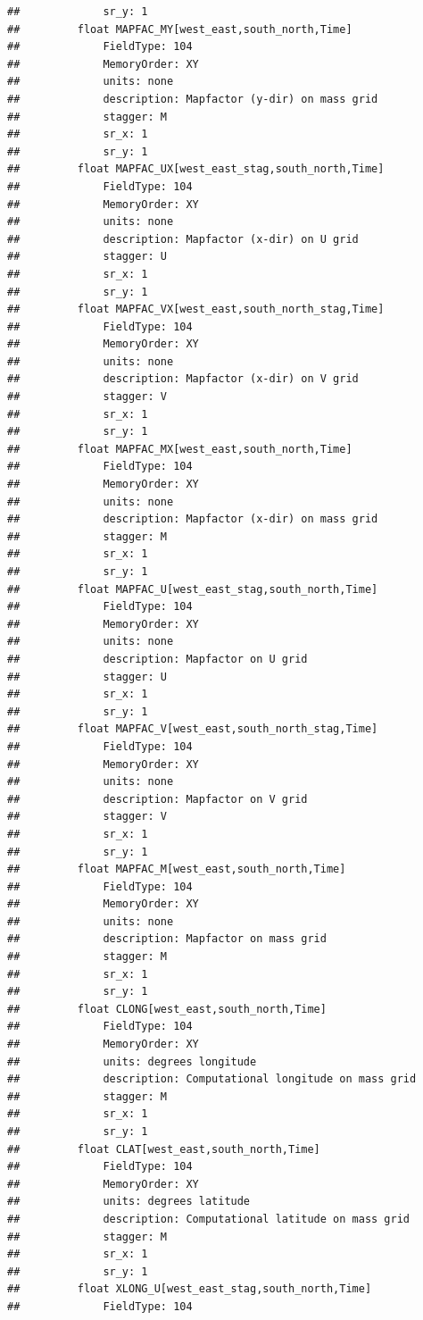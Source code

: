 \documentclass[]{book}
\begin{document}
\begin{verbatim}
##             sr_y: 1
##         float MAPFAC_MY[west_east,south_north,Time]   
##             FieldType: 104
##             MemoryOrder: XY 
##             units: none
##             description: Mapfactor (y-dir) on mass grid
##             stagger: M
##             sr_x: 1
##             sr_y: 1
##         float MAPFAC_UX[west_east_stag,south_north,Time]   
##             FieldType: 104
##             MemoryOrder: XY 
##             units: none
##             description: Mapfactor (x-dir) on U grid
##             stagger: U
##             sr_x: 1
##             sr_y: 1
##         float MAPFAC_VX[west_east,south_north_stag,Time]   
##             FieldType: 104
##             MemoryOrder: XY 
##             units: none
##             description: Mapfactor (x-dir) on V grid
##             stagger: V
##             sr_x: 1
##             sr_y: 1
##         float MAPFAC_MX[west_east,south_north,Time]   
##             FieldType: 104
##             MemoryOrder: XY 
##             units: none
##             description: Mapfactor (x-dir) on mass grid
##             stagger: M
##             sr_x: 1
##             sr_y: 1
##         float MAPFAC_U[west_east_stag,south_north,Time]   
##             FieldType: 104
##             MemoryOrder: XY 
##             units: none
##             description: Mapfactor on U grid
##             stagger: U
##             sr_x: 1
##             sr_y: 1
##         float MAPFAC_V[west_east,south_north_stag,Time]   
##             FieldType: 104
##             MemoryOrder: XY 
##             units: none
##             description: Mapfactor on V grid
##             stagger: V
##             sr_x: 1
##             sr_y: 1
##         float MAPFAC_M[west_east,south_north,Time]   
##             FieldType: 104
##             MemoryOrder: XY 
##             units: none
##             description: Mapfactor on mass grid
##             stagger: M
##             sr_x: 1
##             sr_y: 1
##         float CLONG[west_east,south_north,Time]   
##             FieldType: 104
##             MemoryOrder: XY 
##             units: degrees longitude
##             description: Computational longitude on mass grid
##             stagger: M
##             sr_x: 1
##             sr_y: 1
##         float CLAT[west_east,south_north,Time]   
##             FieldType: 104
##             MemoryOrder: XY 
##             units: degrees latitude
##             description: Computational latitude on mass grid
##             stagger: M
##             sr_x: 1
##             sr_y: 1
##         float XLONG_U[west_east_stag,south_north,Time]   
##             FieldType: 104

\end{verbatim}
\end{document}
